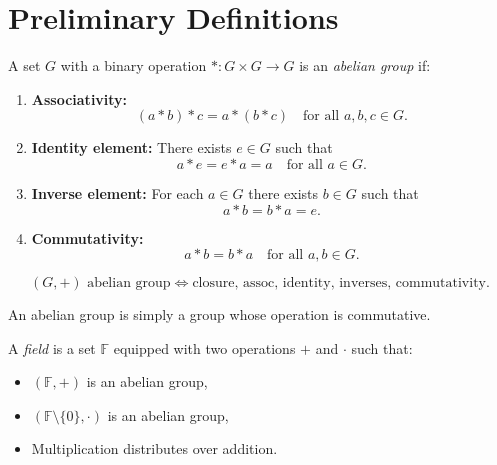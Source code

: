 
\section{Preliminary Definitions}

\begin{definition}
\label{def:abelian-group}
A set $G$ with a binary operation $\ast : G \times G \to G$
is an \emph{abelian group} if:

\begin{enumerate}
\item \textbf{Associativity:}
\[
(a \ast b) \ast c = a \ast (b \ast c)
\quad\text{for all } a,b,c \in G.
\]

\item \textbf{Identity element:}
There exists $e \in G$ such that
\[
a \ast e = e \ast a = a
\quad\text{for all } a \in G.
\]

\item \textbf{Inverse element:}
For each $a \in G$ there exists $b \in G$ such that
\[
a \ast b = b \ast a = e.
\]

\item \textbf{Commutativity:}
\[
a \ast b = b \ast a
\quad\text{for all } a,b \in G.
\]
\end{enumerate}
\end{definition}

\begin{remark*}
\[ (G,+)\text{ abelian group} \iff \text{closure, assoc, identity, inverses, commutativity}. \]
\end{remark*}

\begin{remark*}[Flash]
\end{remark*}

\begin{remark*}
An abelian group is simply a group whose operation is commutative.
\end{remark*}

\begin{definition}
\label{def:field-structural}
A \emph{field} is a set $\mathbb{F}$ equipped with two operations
$+$ and $\cdot$ such that:

\begin{itemize}
\item $(\mathbb{F}, +)$ is an abelian group,
\item $(\mathbb{F}\setminus\{0\}, \cdot)$ is an abelian group,
\item Multiplication distributes over addition.
\end{itemize}
\end{definition}

